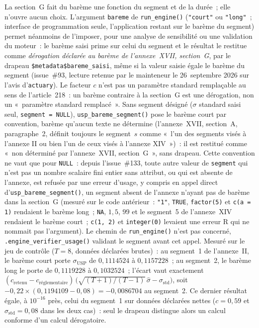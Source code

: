 \documentclass[a4paper,11pt]{article}
\newcommand{\code}[1]{\texttt{\small #1}}
\begin{document}
\noindent
La section~G fait du barème une fonction du segment et de la durée~; elle n'ouvre aucun choix.
L'argument \code{bareme} de \code{run\_engine()} (\code{"court"} ou \code{"long"}~; interface de
programmation seule, l'application restant sur le barème du segment) permet néanmoins de
l'imposer, pour une analyse de sensibilité ou une validation du moteur~: le barème saisi prime
sur celui du segment et le résultat le restitue comme \emph{dérogation déclarée au barème de
l'annexe~XVII, section~G}, par le drapeau \code{\$metadata\$bareme\_saisi}, même si la valeur
saisie égale le barème du segment (issue~\#93, lecture retenue par le mainteneur le 26~septembre
2026 sur l'avis d'\code{actuary}). Le facteur $c$ n'est pas un paramètre standard remplaçable au
sens de l'article~218~: un barème contraire à la section~G est une dérogation, non un
«~paramètre standard remplacé~». Sans segment désigné ($\sigma$ standard saisi seul,
\code{segment = NULL}), \code{usp\_bareme\_segment()} pose le barème court par convention, barème qu'aucun texte ne
détermine (l'annexe~XVII, section~A, paragraphe~2, définit toujours le segment~$s$ comme «~l'un
des segments visés à l'annexe II ou bien l'un de ceux visés à l'annexe XIV~»)~: il est restitué comme «~non déterminé par l'annexe~XVII, section~G~», sans drapeau.
Cette convention ne vaut que pour \code{NULL}~: depuis l'issue~\#133, toute autre valeur de
\code{segment} qui n'est pas un nombre scalaire fini entier sans attribut, ou qui est absente de
l'annexe, est refusée par une erreur d'usage, y compris en appel direct
d'\code{usp\_bareme\_segment()}, un segment absent de l'annexe n'ayant pas de barème dans la
section~G (mesuré sur le code antérieur~: \code{"1"}, \code{TRUE}, \code{factor(5)} et
\code{c(a = 1)} rendaient le barème long~; \code{NA}, $1{,}5$, $99$ et le segment~5 de
l'annexe~XIV rendaient le barème court~; \code{c(1, 2)} et \code{integer(0)} levaient une
erreur R qui ne nommait pas l'argument). Le chemin de \code{run\_engine()} n'est pas concerné,
\code{.engine\_verifier\_usage()} validant le segment avant cet appel.
Mesuré sur le jeu de contrôle ($T = 8$, données déclarées brutes)~: au segment~1 de
l'annexe~II, le barème court porte $\sigma_{\mathrm{USP}}$ de $0{,}1114524$ à $0{,}1157228$~; au
segment~2, le barème long le porte de $0{,}1119228$ à $0{,}1032524$~; l'écart vaut exactement
$(c_{\text{retenu}} - c_{\text{réglementaire}})\,\big(\sqrt{(T+1)/(T-1)}\,\hat\sigma -
\sigma_{\text{std}}\big)$, soit $-0{,}22 \times (0{,}1194109 - 0{,}08) = -0{,}0086704$ au
segment~2. Ce dernier résultat égale, à $10^{-16}$ près, celui du segment~1 sur données déclarées
nettes ($c = 0{,}59$ et $\sigma_{\text{std}} = 0{,}08$ dans les deux cas)~: seul le drapeau
distingue alors un calcul conforme d'un calcul dérogatoire.
\end{document}
